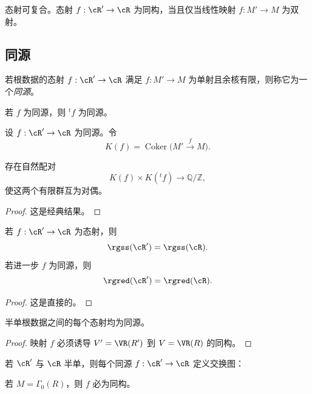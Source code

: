 \begin{lemma}\label{sga3:XXI:6.1.4}
态射可复合。态射 \(f:\cR'\to\cR\) 为同构，当且仅当线性映射 \(f:M'\to M\) 为双射。
\end{lemma}

\subsection{同源}\label{sga3:XXI:6.2}

\begin{definition}\label{sga3:XXI:6.2.1}
若根数据的态射 \(f:\cR'\to\cR\) 满足 \(f:M'\to M\) 为单射且余核有限，则称它为一个\emph{同源}。
\end{definition}

若 \(f\) 为同源，则 \({}^tf\) 为同源。

\begin{definition}\label{sga3:XXI:6.2.2}
设 \(f:\cR'\to\cR\) 为同源。令
\[
 K(f)=\operatorname{Coker}\bigl(M'\xrightarrow{f}M\bigr).
\]
\end{definition}

\begin{lemma}\label{sga3:XXI:6.2.3}
存在自然配对
\[
 K(f)\times K({}^tf)\longrightarrow\mathbb Q/\mathbb Z,
\]
使这两个有限群互为对偶。
\end{lemma}

\begin{proof}
这是经典结果。
\end{proof}

\begin{lemma}\label{sga3:XXI:6.2.4}
若 \(f:\cR'\to\cR\) 为态射，则
\[
 \rgss(\cR')=\rgss(\cR).
\]
若进一步 \(f\) 为同源，则
\[
 \rgred(\cR')=\rgred(\cR).
\]
\end{lemma}

\begin{proof}
这是直接的。
\end{proof}

\begin{lemma}\label{sga3:XXI:6.2.5}
半单根数据之间的每个态射均为同源。
\end{lemma}

\begin{proof}
映射 \(f\) 必须诱导 \(V'=\VR(R')\) 到 \(V=\VR(R)\) 的同构。
\end{proof}

若 \(\cR'\) 与 \(\cR\) 半单，则每个同源 \(f:\cR'\to\cR\) 定义交换图：
\begin{center}
\end{center}
若 \(M=\Gamma_0(R)\)，则 \(f\) 必为同构。

